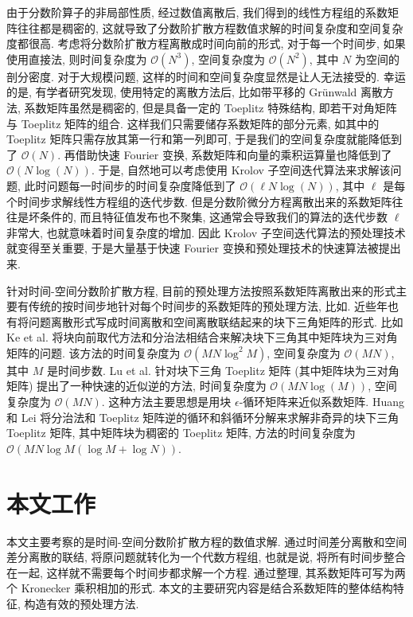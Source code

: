 \documentclass{ecnumaster}
\begin{document}
由于分数阶算子的非局部性质, 经过数值离散后, 我们得到的线性方程组的系数矩阵往往都是稠密的,
这就导致了分数阶扩散方程数值求解的时间复杂度和空间复杂度都很高.
考虑将分数阶扩散方程离散成时间向前的形式, 对于每一个时间步, 如果使用直接法,
则时间复杂度为 $\mathcal{O}(N^3)$, 空间复杂度为 $\mathcal{O}(N^2)$,
其中 $N$ 为空间的剖分密度.
对于大规模问题, 这样的时间和空间复杂度显然是让人无法接受的.
幸运的是, 有学者研究发现, 使用特定的离散方法后, 比如带平移的 Gr\"unwald 离散方法\cite{WW11},
系数矩阵虽然是稠密的, 但是具备一定的 Toeplitz 特殊结构\cite{WWS10},
即若干对角矩阵与 Toeplitz 矩阵的组合.
这样我们只需要储存系数矩阵的部分元素, 如其中的 Toeplitz 矩阵只需存放其第一行和第一列即可,
于是我们的空间复杂度就能降低到了 $\mathcal{O}(N)$.
再借助快速 Fourier 变换, 系数矩阵和向量的乘积运算量也降低到了 $\mathcal{O}(N\log (N))$.
于是, 自然地可以考虑使用 Krolov 子空间迭代算法来求解该问题,
此时问题每一时间步的时间复杂度降低到了 $\mathcal{O}(\ell N\log (N))$,
其中 $\ell$ 是每个时间步求解线性方程组的迭代步数.
但是分数阶微分方程离散出来的系数矩阵往往是坏条件的,
而且特征值发布也不聚集, 这通常会导致我们的算法的迭代步数 $\ell$ 非常大,
也就意味着时间复杂度的增加.
因此 Krolov 子空间迭代算法的预处理技术就变得至关重要,
于是大量基于快速 Fourier 变换和预处理技术的快速算法被提出来\cite{BLP17, DMS16, JLZ15, LS13, LYJ14, PKNS14, PS12, SYM15, WWS10, WD13, WW11}.

针对时间-空间分数阶扩散方程,
目前的预处理方法按照系数矩阵离散出来的形式主要有传统的按时间步地针对每个时间步的系数矩阵的预处理方法,
比如\cite{GHJCA17, LGHFZ18, LS13, PS12, GHLLL14, GHZLL15, WWS10, ZZL18}.
%
近些年也有将问题离散形式写成时间离散和空间离散联结起来的块下三角矩阵的形式.
比如 Ke et al.\cite{KNS15} 将块向前取代方法和分治法相结合来解决块下三角其中矩阵块为三对角矩阵的问题.
该方法的时间复杂度为 $\mathcal{O}(MN\log^2M)$, 空间复杂度为 $\mathcal{O}(MN)$, 其中 $M$ 是时间步数.
Lu et al.\cite{LPS15} 针对块下三角 Toeplitz 矩阵
(其中矩阵块为三对角矩阵) 提出了一种快速的近似逆的方法,
时间复杂度为 $\mathcal{O}(MN\log(M))$, 空间复杂度为 $\mathcal{O}(MN)$.
这种方法主要思想是用块 $\epsilon$-循环矩阵来近似系数矩阵.
Huang 和 Lei \cite{HL17} 将分治法和 Toeplitz 矩阵逆的循环和斜循环分解来求解非奇异的块下三角 Toeplitz 矩阵,
其中矩阵块为稠密的 Toeplitz 矩阵, 方法的时间复杂度为 $\mathcal{O}(MN\log M(\log M + \log N))$.



\section{本文工作}
本文主要考察的是时间-空间分数阶扩散方程的数值求解.
通过时间差分离散和空间差分离散的联结, 将原问题就转化为一个代数方程组,
也就是说, 将所有时间步整合在一起, 这样就不需要每个时间步都求解一个方程.
%
通过整理, 其系数矩阵可写为两个 Kronecker 乘积相加的形式.
本文的主要研究内容是结合系数矩阵的整体结构特征, 构造有效的预处理方法.
\end{document}
